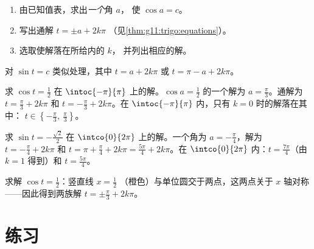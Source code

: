 \begin{method}[在区间上解 $\cos t = c$]\label{met:g11:trigo:solve}
\begin{enumerate}
  \item 由已知值表，求出\emph{一个}角 $a$，
        使 $\cos a = c$。
  \item 写出通解 $t = \pm a + 2k\pi$
        （见\cref{thm:g11:trigo:equations}）。
  \item 选取使解落在所给内的 $k$，
        并列出相应的解。
\end{enumerate}
对 $\sin t = c$ 类似处理，其中 $t = a + 2k\pi$ 或
$t = \pi - a + 2k\pi$。
\end{method}

\begin{example}\label{ex:g11:trigo:solve}
求 $\cos t = \frac12$ 在 $\intoc{-\pi}{\pi}$ 上的解。$\cos a = \frac12$ 的一个解为
$a = \frac{\pi}{3}$。通解为
$t = \frac\pi3 + 2k\pi$ 和 $t = -\frac\pi3 + 2k\pi$。在
$\intoc{-\pi}{\pi}$ 内，只有 $k = 0$ 时的解落在其中：
$t \in \left\{-\frac\pi3,\ \frac\pi3\right\}$。

求 $\sin t = -\frac{\sqrt2}{2}$ 在 $\intco{0}{2\pi}$ 上的解。一个角为
$a = -\frac\pi4$，解为 $t = -\frac\pi4 + 2k\pi$ 和
$t = \pi + \frac\pi4 + 2k\pi = \frac{5\pi}{4} + 2k\pi$。在
$\intco{0}{2\pi}$ 内：$t = \frac{7\pi}{4}$（由 $k = 1$ 得到）和
$t = \frac{5\pi}{4}$。
\end{example}

\begin{omfigure}

{\small 求解 $\cos t = \frac12$：竖直线 $x = \frac12$
（橙色）与单位圆交于两点，这两点关于 $x$ 轴对称
——因此得到两族解 $t = \pm\frac\pi3 + 2k\pi$。}
\end{omfigure}

\section{练习}

